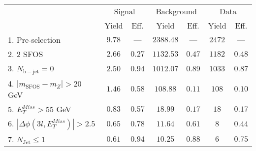 \begin{tabular}{l||c|c||c|c||c|c}
\hline
 &                 \multicolumn{2}{c||}{Signal}            &  \multicolumn{2}{c||}{Background} &  \multicolumn{2}{c}{Data} \\
   & Yield & Eff. & Yield & Eff. & Yield & Eff.\\
   \hline\hline
   1. Pre-selection &  $9.78$ & --- &  $2388.48$ & --- & $2472$ &  --- \\ 
   \hline
   2. 2 SFOS &  $2.66$ &  $0.27$ &  $1132.53$ &  $0.47$ & $1182$ &  $0.48$\\ 
   \hline
   3. $N_{\mathrm{b-jet}}=0$ &  $2.50$ &  $0.94$ &  $1012.07$ &  $0.89$ & $1033$ &  $0.87$\\ 
   \hline
   4. $| m_{\mathrm{SFOS}} - m_Z | >  20$ GeV &  $1.46$ &  $0.58$ &  $108.88$ &  $0.11$ & $108$ &  $0.10$\\ 
   \hline
   5. $E_{T}^{Miss} > 55$ GeV &  $0.83$ &  $0.57$ &  $18.99$ &  $0.17$ & $18$ &  $0.17$\\ 
   \hline
   6. $|\Delta\phi(3l,E_{T}^{Miss})| > 2.5$ &  $0.65$ &  $0.78$ &  $11.64$ &  $0.61$ & $8$ &  $0.44$\\ 
   \hline
   7. $N_{\mathrm{Jet}} \leq 1$ &  $0.61$ &  $0.94$ &  $10.25$ &  $0.88$ & $6$ &  $0.75$\\ 
   \hline
   \end{tabular}


